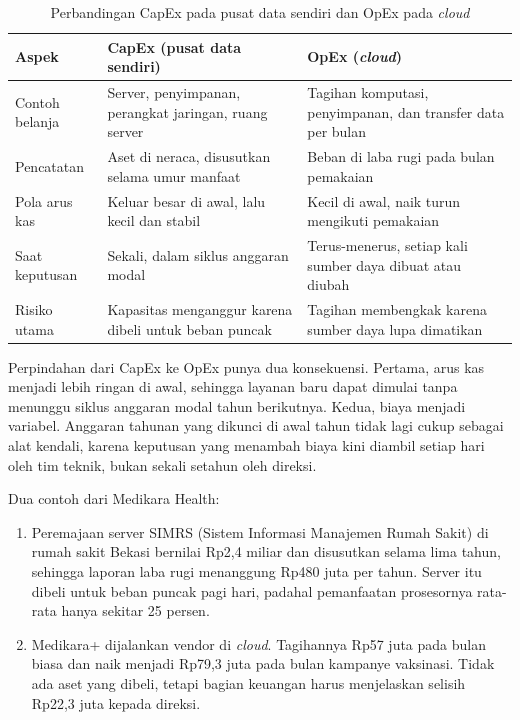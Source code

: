\begin{table}[!htb]
  \centering
  \caption{Perbandingan CapEx pada pusat data sendiri dan OpEx pada \textit{cloud}}
  \label{tab:ch03-capex-opex}
  \footnotesize
  \begin{tabularx}{\textwidth}{>{\raggedright\arraybackslash}p{2.3cm} >{\raggedright\arraybackslash}X >{\raggedright\arraybackslash}X}
    \hline
    \textbf{Aspek} & \textbf{CapEx (pusat data sendiri)} & \textbf{OpEx (\textit{cloud})} \\ \hline
    Contoh belanja & Server, penyimpanan, perangkat jaringan, ruang server & Tagihan komputasi,
      penyimpanan, dan transfer data per bulan \\ \hline
    Pencatatan & Aset di neraca, disusutkan selama umur manfaat & Beban di laba rugi pada bulan
      pemakaian \\ \hline
    Pola arus kas & Keluar besar di awal, lalu kecil dan stabil & Kecil di awal, naik turun
      mengikuti pemakaian \\ \hline
    Saat keputusan & Sekali, dalam siklus anggaran modal & Terus-menerus, setiap kali sumber daya
      dibuat atau diubah \\ \hline
    Risiko utama & Kapasitas menganggur karena dibeli untuk beban puncak & Tagihan membengkak karena
      sumber daya lupa dimatikan \\ \hline
  \end{tabularx}
\end{table}

Perpindahan dari CapEx ke OpEx punya dua konsekuensi. Pertama, arus kas menjadi lebih ringan di
awal, sehingga layanan baru dapat dimulai tanpa menunggu siklus anggaran modal tahun berikutnya.
Kedua, biaya menjadi variabel. Anggaran tahunan yang dikunci di awal tahun tidak lagi cukup sebagai
alat kendali, karena keputusan yang menambah biaya kini diambil setiap hari oleh tim teknik, bukan
sekali setahun oleh direksi.

Dua contoh dari Medikara Health:
\begin{enumerate}
  \item Peremajaan server SIMRS (Sistem Informasi Manajemen Rumah Sakit) di rumah sakit Bekasi
        bernilai Rp2,4 miliar dan disusutkan selama lima tahun, sehingga laporan laba rugi
        menanggung Rp480 juta per tahun. Server itu dibeli untuk beban puncak pagi hari, padahal
        pemanfaatan prosesornya rata-rata hanya sekitar 25 persen.
  \item Medikara+ dijalankan vendor di \textit{cloud}. Tagihannya Rp57 juta pada bulan biasa dan
        naik menjadi Rp79,3 juta pada bulan kampanye vaksinasi. Tidak ada aset yang dibeli, tetapi
        bagian keuangan harus menjelaskan selisih Rp22,3 juta kepada direksi.
\end{enumerate}

